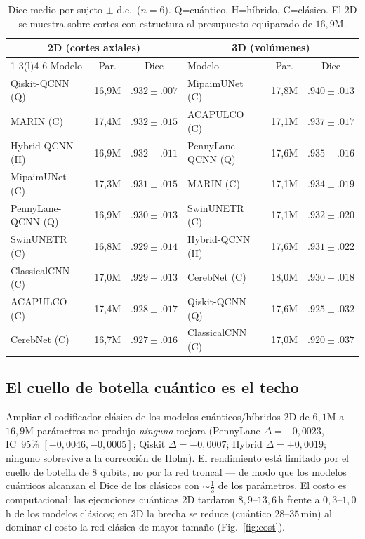 \documentclass[runningheads]{llncs}
\begin{document}
\begin{table}[t]
\centering
\caption{Dice medio por sujeto $\pm$ d.e.\ ($n{=}6$). Q=cuántico, H=híbrido,
C=clásico. El 2D se muestra sobre cortes con estructura al presupuesto
equiparado de $16{,}9$M.}
\label{tab:main}
\small
\setlength{\tabcolsep}{4pt}
\begin{tabular}{lcc@{\hskip 1em}lcc}
\toprule
\multicolumn{3}{c}{\textbf{2D (cortes axiales)}} &
\multicolumn{3}{c}{\textbf{3D (volúmenes)}}\\
\cmidrule(r){1-3}\cmidrule(l){4-6}
Modelo & Par. & Dice & Modelo & Par. & Dice\\
\midrule
Qiskit-QCNN (Q)    & 16,9M & $.932{\pm}.007$ & MipaimUNet (C)     & 17,8M & $.940{\pm}.013$\\
MARIN (C)          & 17,4M & $.932{\pm}.015$ & ACAPULCO (C)       & 17,1M & $.937{\pm}.017$\\
Hybrid-QCNN (H)    & 16,9M & $.932{\pm}.011$ & PennyLane-QCNN (Q) & 17,6M & $.935{\pm}.016$\\
MipaimUNet (C)     & 17,3M & $.931{\pm}.015$ & MARIN (C)          & 17,1M & $.934{\pm}.019$\\
PennyLane-QCNN (Q) & 16,9M & $.930{\pm}.013$ & SwinUNETR (C)      & 17,1M & $.932{\pm}.020$\\
SwinUNETR (C)      & 16,8M & $.929{\pm}.014$ & Hybrid-QCNN (H)    & 17,6M & $.931{\pm}.022$\\
ClassicalCNN (C)   & 17,0M & $.929{\pm}.013$ & CerebNet (C)       & 18,0M & $.930{\pm}.018$\\
ACAPULCO (C)       & 17,4M & $.928{\pm}.017$ & Qiskit-QCNN (Q)    & 17,6M & $.925{\pm}.032$\\
CerebNet (C)       & 16,7M & $.927{\pm}.016$ & ClassicalCNN (C)   & 17,0M & $.920{\pm}.037$\\
\bottomrule
\end{tabular}
\end{table}

\subsection{El cuello de botella cuántico es el techo}
Ampliar el codificador clásico de los modelos cuánticos/híbridos 2D de
$6{,}1$M a $16{,}9$M parámetros no produjo \emph{ninguna} mejora
(PennyLane $\Delta{=}{-}0{,}0023$, IC~95\% $[-0{,}0046,-0{,}0005]$;
Qiskit $\Delta{=}{-}0{,}0007$; Hybrid $\Delta{=}{+}0{,}0019$; ninguno sobrevive
a la corrección de Holm). El rendimiento está limitado por el cuello de botella
de $8$ qubits, no por la red troncal --- de modo que los modelos cuánticos
alcanzan el Dice de los clásicos con ${\sim}\tfrac13$ de los parámetros. El
costo es computacional: las ejecuciones cuánticas 2D tardaron $8{,}9$--$13{,}6$\,h
frente a $0{,}3$--$1{,}0$\,h de los modelos clásicos; en 3D la brecha se reduce
(cuántico $28$--$35$\,min) al dominar el costo la red clásica de mayor tamaño
(Fig.~\ref{fig:cost}).
\end{document}
